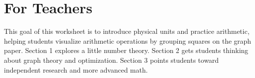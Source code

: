 \documentclass{article}
\begin{document}
\section{For Teachers}
This goal of this worksheet is to introduce physical units and practice arithmetic, helping students visualize arithmetic operations by grouping squares on the graph paper. Section 1 explores a little number theory. Section 2 gets students thinking about graph theory and optimization. Section 3 points students toward independent research and more advanced math.



\end{document}
